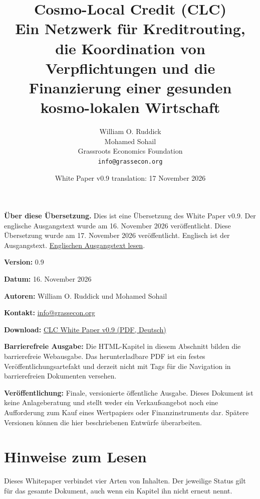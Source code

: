 \documentclass[11pt]{article}
\title{Cosmo-Local Credit (CLC)\\Ein Netzwerk für Kreditrouting, die Koordination von Verpflichtungen und die Finanzierung einer gesunden kosmo-lokalen Wirtschaft}
\author{William O. Ruddick \\ Mohamed Sohail \\ Grassroots Economics Foundation \\ \texttt{info@grassecon.org}}
\date{White Paper v0.9 translation: 17 November 2026}
\begin{document}
\maketitle
\tableofcontents
\newpage
\sloppy
\RaggedRight

\textbf{Über diese Übersetzung.} Dies ist eine Übersetzung des White Paper v0.9. Der englische Ausgangstext wurde am 16. November 2026 veröffentlicht. Diese Übersetzung wurde am 17. November 2026 veröffentlicht. Englisch ist der Ausgangstext. \href{https://docs.cosmolocal.credit/white-paper}{Englischen Ausgangstext lesen}.

\textbf{Version:} 0.9

\textbf{Datum:} 16. November 2026

\textbf{Autoren:} William O. Ruddick und Mohamed Sohail

\textbf{Kontakt:} \href{mailto:info@grassecon.org}{info@grassecon.org}

\textbf{Download:} \href{https://docs.cosmolocal.credit/white-paper/Cosmo-Local-Credit-CLC-White-Paper-v9-de.pdf}{CLC White Paper v0.9 (PDF, Deutsch)}

\textbf{Barrierefreie Ausgabe:} Die HTML-Kapitel in diesem Abschnitt bilden die barrierefreie Webausgabe. Das herunterladbare PDF ist ein festes Veröffentlichungsartefakt und derzeit nicht mit Tags für die Navigation in barrierefreien Dokumenten versehen.

\textbf{Veröffentlichung:} Finale, versionierte öffentliche Ausgabe. Dieses Dokument ist keine Anlageberatung und stellt weder ein Verkaufsangebot noch eine Aufforderung zum Kauf eines Wertpapiers oder Finanzinstruments dar. Spätere Versionen können die hier beschriebenen Entwürfe überarbeiten.

\section*{Hinweise zum Lesen}

Dieses Whitepaper verbindet vier Arten von Inhalten. Der jeweilige Status gilt für das gesamte Dokument, auch wenn ein Kapitel ihn nicht erneut nennt.
\end{document}
